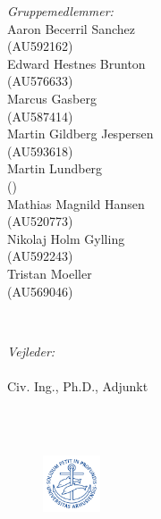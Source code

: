 \begin{titlepage}
\begin{minipage}{0.4\textwidth}
\begin{flushleft} \small
\emph{Gruppemedlemmer:}
\\Aaron Becerril Sanchez\\ (AU592162)
\\Edward Hestnes Brunton\\ (AU576633)
\\Marcus Gasberg\\ (AU587414) 
\\Martin Gildberg Jespersen\\ (AU593618) 
\\Martin Lundberg\\ () 
\\Mathias Magnild Hansen\\ (AU520773)
\\Nikolaj Holm Gylling\\ (AU592243)
\\Tristan Moeller\\ (AU569046)
\end{flushleft}
\end{minipage}
~
\begin{minipage}{0.4\textwidth}
\begin{flushright} \small
\emph{Vejleder:} \\
\vejleder \\ Civ. Ing., Ph.D., Adjunkt %
\end{flushright}
\end{minipage}\\[1cm]



{\large \afleveringsdato}\\[1cm] %


\begin{figure}[H]
    \centering
    \includegraphics[width=0.15\textwidth]{Setup/graphics/AU.png}
\end{figure}

\vfill
\end{titlepage}